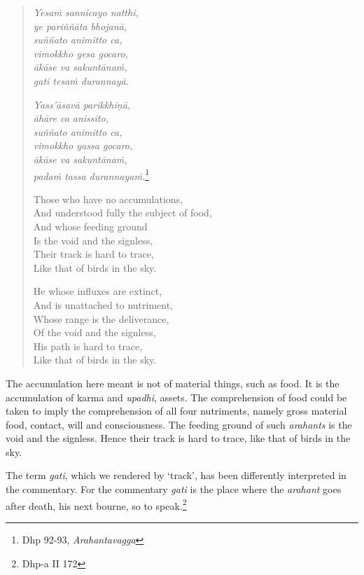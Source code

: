 \begin{quote}
\emph{Yesaṁ sannicayo natthi,}\\
\emph{ye pariññāta bhojanā,}\\
\emph{suññato animitto ca,}\\
\emph{vimokkho yesa gocaro,}\\
\emph{ākāse va sakuntānaṁ,}\\
\emph{gati tesaṁ durannayā.}

\emph{Yass'āsavā parikkhīṇā,}\\
\emph{āhāre ca anissito,}\\
\emph{suññato animitto ca,}\\
\emph{vimokkho yassa gocaro,}\\
\emph{ākāse va sakuntānaṁ,}\\
\emph{padaṁ tassa durannayaṁ.}\footnote{Dhp 92-93, \emph{Arahantavagga}}

Those who have no accumulations,\\
And understood fully the subject of food,\\
And whose feeding ground\\
Is the void and the signless,\\
Their track is hard to trace,\\
Like that of birds in the sky.

He whose influxes are extinct,\\
And is unattached to nutriment,\\
Whose range is the deliverance,\\
Of the void and the signless,\\
His path is hard to trace,\\
Like that of birds in the sky.
\end{quote}

The accumulation here meant is not of material things, such as food. It is the accumulation of karma and \emph{upadhi}, assets. The comprehension of food could be taken to imply the comprehension of all four nutriments, namely gross material food, contact, will and consciousness. The feeding ground of such \emph{arahants} is the void and the signless. Hence their track is hard to trace, like that of birds in the sky.

The term \emph{gati}, which we rendered by `track', has been differently interpreted in the commentary. For the commentary \emph{gati} is the place where the \emph{arahant} goes after death, his next bourne, so to speak.\footnote{Dhp-a II 172}

